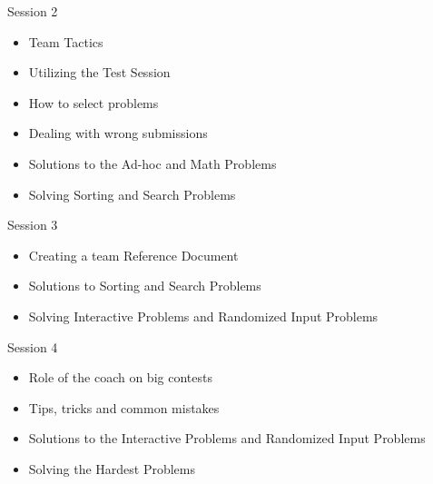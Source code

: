 \documentclass[11pt,pdf, aspectratio=169]{beamer}
\begin{document}
  \begin{frame}{Session 2}
    \begin{itemize}
      \item Team Tactics
      \item Utilizing the Test Session
      \item How to select problems
      \item Dealing with wrong submissions
      \item Solutions to the Ad-hoc and Math Problems
      \item Solving Sorting and Search Problems
    \end{itemize}
  \end{frame}
  \begin{frame}{Session 3}
    \begin{itemize}
      \item Creating a team Reference Document
      \item Solutions to Sorting and Search Problems
      \item Solving Interactive Problems and Randomized Input Problems
    \end{itemize}
  \end{frame}
  \begin{frame}{Session 4}
    \begin{itemize}
      \item Role of the coach on big contests
      \item Tips, tricks and common mistakes
      \item Solutions to the Interactive Problems and Randomized Input Problems
      \item Solving the Hardest Problems
    \end{itemize}
  \end{frame}
\end{document}
